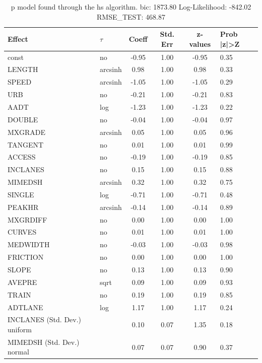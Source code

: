 \begin{table}
	\caption{p model found through the hs algorithm. bic: 1873.80 Log-Likelihood: -842.02 RMSE_TEST: 468.87}
	\begin{center}
		\begin{tabular}{|l|l|c|c|c|l|}
			\hline
			Effect & $\tau$ & Coeff & Std. Err & z-values & Prob |z|>Z \\
			\hline
			const & no & -0.95 & 1.00 & -0.95 & 0.35 \\
			\hline
			LENGTH & arcsinh & 0.98 & 1.00 & 0.98 & 0.33 \\
			\hline
			SPEED & arcsinh & -1.05 & 1.00 & -1.05 & 0.29 \\
			\hline
			URB & no & -0.21 & 1.00 & -0.21 & 0.83 \\
			\hline
			AADT & log & -1.23 & 1.00 & -1.23 & 0.22 \\
			\hline
			DOUBLE & no & -0.04 & 1.00 & -0.04 & 0.97 \\
			\hline
			MXGRADE & arcsinh & 0.05 & 1.00 & 0.05 & 0.96 \\
			\hline
			TANGENT & no & 0.01 & 1.00 & 0.01 & 0.99 \\
			\hline
			ACCESS & no & -0.19 & 1.00 & -0.19 & 0.85 \\
			\hline
			INCLANES & no & 0.15 & 1.00 & 0.15 & 0.88 \\
			\hline
			MIMEDSH & arcsinh & 0.32 & 1.00 & 0.32 & 0.75 \\
			\hline
			SINGLE & log & -0.71 & 1.00 & -0.71 & 0.48 \\
			\hline
			PEAKHR & arcsinh & -0.14 & 1.00 & -0.14 & 0.89 \\
			\hline
			MXGRDIFF & no & 0.00 & 1.00 & 0.00 & 1.00 \\
			\hline
			CURVES & no & 0.01 & 1.00 & 0.01 & 1.00 \\
			\hline
			MEDWIDTH & no & -0.03 & 1.00 & -0.03 & 0.98 \\
			\hline
			FRICTION & no & 0.00 & 1.00 & 0.00 & 1.00 \\
			\hline
			SLOPE & no & 0.13 & 1.00 & 0.13 & 0.90 \\
			\hline
			AVEPRE & sqrt & 0.09 & 1.00 & 0.09 & 0.93 \\
			\hline
			TRAIN & no & 0.19 & 1.00 & 0.19 & 0.85 \\
			\hline
			ADTLANE & log & 1.17 & 1.00 & 1.17 & 0.24 \\
			\hline
			INCLANES (Std. Dev.) uniform &  & 0.10 & 0.07 & 1.35 & 0.18 \\
			\hline
			MIMEDSH (Std. Dev.) normal &  & 0.07 & 0.07 & 0.90 & 0.37 \\

\end{tabular}
\end{center}
\end{table}
